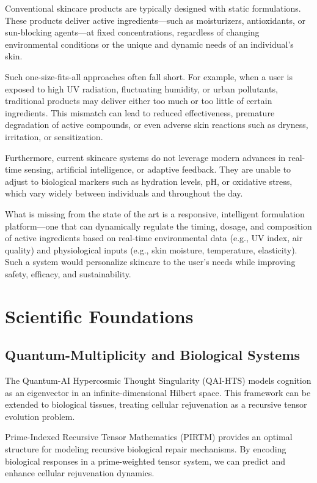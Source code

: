 \documentclass{article}
\theoremstyle{plain}
\theoremstyle{claimstyle}
\begin{document}
Conventional skincare products are typically designed with static formulations. These products deliver active ingredients—such as moisturizers, antioxidants, or sun-blocking agents—at fixed concentrations, regardless of changing environmental conditions or the unique and dynamic needs of an individual's skin.

Such one-size-fits-all approaches often fall short. For example, when a user is exposed to high UV radiation, fluctuating humidity, or urban pollutants, traditional products may deliver either too much or too little of certain ingredients. This mismatch can lead to reduced effectiveness, premature degradation of active compounds, or even adverse skin reactions such as dryness, irritation, or sensitization.

Furthermore, current skincare systems do not leverage modern advances in real-time sensing, artificial intelligence, or adaptive feedback. They are unable to adjust to biological markers such as hydration levels, pH, or oxidative stress, which vary widely between individuals and throughout the day.

What is missing from the state of the art is a responsive, intelligent formulation platform—one that can dynamically regulate the timing, dosage, and composition of active ingredients based on real-time environmental data (e.g., UV index, air quality) and physiological inputs (e.g., skin moisture, temperature, elasticity). Such a system would personalize skincare to the user’s needs while improving safety, efficacy, and sustainability.

\section{Scientific Foundations}

\subsection{Quantum-Multiplicity and Biological Systems}
The Quantum-AI Hypercosmic Thought Singularity (QAI-HTS) models cognition as an eigenvector in an infinite-dimensional Hilbert space. This framework can be extended to biological tissues, treating cellular rejuvenation as a recursive tensor evolution problem.

Prime-Indexed Recursive Tensor Mathematics (PIRTM) provides an optimal structure for modeling recursive biological repair mechanisms. By encoding biological responses in a prime-weighted tensor system, we can predict and enhance cellular rejuvenation dynamics.
\end{document}
